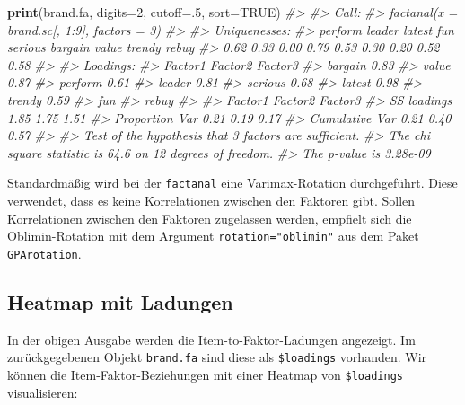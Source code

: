 \documentclass[12pt,]{book}
\makeatletter
\newenvironment{Shaded}{\begin{snugshade}}{\end{snugshade}}
\newcommand{\KeywordTok}[1]{\textcolor[rgb]{0.13,0.29,0.53}{\textbf{{#1}}}}
\newcommand{\DataTypeTok}[1]{\textcolor[rgb]{0.13,0.29,0.53}{{#1}}}
\newcommand{\DecValTok}[1]{\textcolor[rgb]{0.00,0.00,0.81}{{#1}}}
\newcommand{\CommentTok}[1]{\textcolor[rgb]{0.56,0.35,0.01}{\textit{{#1}}}}
\newcommand{\OtherTok}[1]{\textcolor[rgb]{0.56,0.35,0.01}{{#1}}}
\newcommand{\NormalTok}[1]{{#1}}
\newenvironment{kframe}{%
\medskip{}
\setlength{\fboxsep}{.8em}
 \def\at@end@of@kframe{}%
 \ifinner\ifhmode%
  \def\at@end@of@kframe{\end{minipage}}%
  \begin{minipage}{\columnwidth}%
 \fi\fi%
 \def\FrameCommand##1{\hskip\@totalleftmargin \hskip-\fboxsep
 \colorbox{shadecolor}{##1}\hskip-\fboxsep
     \hskip-\linewidth \hskip-\@totalleftmargin \hskip\columnwidth}%
 \MakeFramed {\advance\hsize-\width
   \@totalleftmargin\z@ \linewidth\hsize
   \@setminipage}}%
 {\par\unskip\endMakeFramed%
 \at@end@of@kframe}
\renewenvironment{Shaded}{\begin{kframe}}{\end{kframe}}
\makeatother
\begin{document}
\begin{Shaded}
\begin{Highlighting}[]
\KeywordTok{print}\NormalTok{(brand.fa, }\DataTypeTok{digits=}\DecValTok{2}\NormalTok{, }\DataTypeTok{cutoff=}\NormalTok{.}\DecValTok{5}\NormalTok{, }\DataTypeTok{sort=}\OtherTok{TRUE}\NormalTok{)}
\CommentTok{#> }
\CommentTok{#> Call:}
\CommentTok{#> factanal(x = brand.sc[, 1:9], factors = 3)}
\CommentTok{#> }
\CommentTok{#> Uniquenesses:}
\CommentTok{#> perform  leader  latest     fun serious bargain   value  trendy   rebuy }
\CommentTok{#>    0.62    0.33    0.00    0.79    0.53    0.30    0.20    0.52    0.58 }
\CommentTok{#> }
\CommentTok{#> Loadings:}
\CommentTok{#>         Factor1 Factor2 Factor3}
\CommentTok{#> bargain  0.83                  }
\CommentTok{#> value    0.87                  }
\CommentTok{#> perform          0.61          }
\CommentTok{#> leader           0.81          }
\CommentTok{#> serious          0.68          }
\CommentTok{#> latest                   0.98  }
\CommentTok{#> trendy                   0.59  }
\CommentTok{#> fun                            }
\CommentTok{#> rebuy                          }
\CommentTok{#> }
\CommentTok{#>                Factor1 Factor2 Factor3}
\CommentTok{#> SS loadings       1.85    1.75    1.51}
\CommentTok{#> Proportion Var    0.21    0.19    0.17}
\CommentTok{#> Cumulative Var    0.21    0.40    0.57}
\CommentTok{#> }
\CommentTok{#> Test of the hypothesis that 3 factors are sufficient.}
\CommentTok{#> The chi square statistic is 64.6 on 12 degrees of freedom.}
\CommentTok{#> The p-value is 3.28e-09}
\end{Highlighting}
\end{Shaded}

Standardmäßig wird bei der \texttt{factanal} eine Varimax-Rotation
durchgeführt. Diese verwendet, dass es keine Korrelationen zwischen den
Faktoren gibt. Sollen Korrelationen zwischen den Faktoren zugelassen
werden, empfielt sich die Oblimin-Rotation mit dem Argument
\texttt{rotation="oblimin"} aus dem Paket \texttt{GPArotation}.

\subsection{Heatmap mit Ladungen}\label{heatmap-mit-ladungen}

In der obigen Ausgabe werden die Item-to-Faktor-Ladungen angezeigt. Im
zurückgegebenen Objekt \texttt{brand.fa} sind diese als
\texttt{\$loadings} vorhanden. Wir können die Item-Faktor-Beziehungen
mit einer Heatmap von \texttt{\$loadings} visualisieren:
\end{document}
